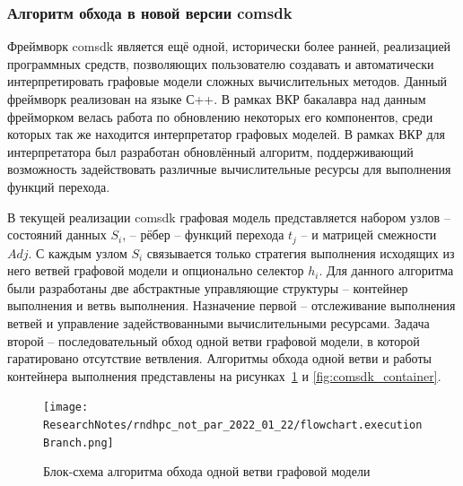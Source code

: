 \subsubsection{Алгоритм обхода в новой версии comsdk}
Фреймворк comsdk является ещё одной, исторически более ранней, реализацией программных средств, позволяющих пользователю создавать и автоматически интерпретировать графовые модели сложных вычислительных методов. Данный фреймворк реализован на языке С++. В рамках ВКР бакалавра над данным фрейморком велась работа по обновлению некоторых его компонентов, среди которых так же находится интерпретатор графовых моделей. В рамках ВКР для интерпретатора был разработан обновлённый алгоритм, поддерживающий возможность задействовать различные вычислительные ресурсы для выполнения функций перехода.

В текущей реализации comsdk графовая модель представляется набором узлов -- состояний данных $S_i$, -- рёбер -- функций перехода $t_j$ -- и матрицей смежности $Adj$. С каждым узлом $S_i$ связывается только стратегия выполнения исходящих из него ветвей графовой модели и опционально селектор $h_i$. Для данного алгоритма были разработаны две абстрактные управляющие структуры -- контейнер выполнения и ветвь выполнения. Назначение первой -- отслеживание выполнения ветвей и управление задействованными вычислительными ресурсами. Задача второй -- последовательный обход одной ветви графовой модели, в которой гаратировано отсутствие ветвления. Алгоритмы обхода одной ветви и работы контейнера выполнения представлены на рисунках~\ref{fig:comsdk_branch} и \ref{fig:comsdk_container}.

\begin{figure}[H]
	\centering
	\texttt{[image: ResearchNotes/rndhpc\_not\_par\_2022\_01\_22/flowchart.executionBranch.png]}
	\caption{Блок-схема алгоритма обхода одной ветви графовой модели}
	\label{fig:comsdk_branch}
\end{figure}


